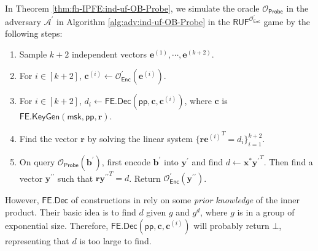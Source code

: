 In Theorem \ref{thm:fh-IPFE:ind-uf-OB-Probe}, we simulate the oracle $\mathcal{O}_{\textsf{Probe}}$ in the adversary $\mathcal{A}^\prime$ in Algorithm \ref{alg:adv:ind-uf-OB-Probe} in the $\textsf{RUF}^{ \mathcal{O}^\prime_{\textsf{Enc}} }$ game by the following steps:

\begin{enumerate}

\item Sample $k+2$ independent vectors $\mathbf{e}^{(1)}, \cdots, \mathbf{e}^{(k+2)}$.

\item For $i \in [k+2]$, $\mathbf{c}^{(i)} \gets \mathcal{O}^\prime_{\textsf{Enc}}(\mathbf{e}^{(i)})$.

\item For $i \in [k+2]$,  $d_i \gets \textsf{FE.Dec}(\textsf{pp}, \mathbf{c}, \mathbf{c}^{(i)})$, where $\mathbf{c}$ is $\textsf{FE.KeyGen}(\textsf{msk}, \textsf{pp}, \mathbf{r})$.

\item Find the vector $\mathbf{r}$ by solving the linear system $\{ \mathbf{r} {\mathbf{e}^{(i)}}^T = d_i \}_{i=1}^{k+2}$.

\item On query $\mathcal{O}_{\textsf{Probe}}(\mathbf{b}^\prime)$, first encode $\mathbf{b}^\prime$ into $\mathbf{y}^\prime$ and find $d \gets \mathbf{x}^{*}{\mathbf{y}^\prime}^T$. Then find a vector $\mathbf{y}^{\prime\prime}$ such that $\mathbf{r} {\mathbf{y}^{\prime\prime}}^T = d$. Return $\mathcal{O}^\prime_{\textsf{Enc}}(\mathbf{y}^{\prime\prime})$.

\end{enumerate}

However, $\textsf{FE.Dec}$ of constructions in \cite{cryptoeprint:2015/1255, 10.1007/978-3-319-45871-7_24, cryptoeprint:2016/440} rely on some \emph{prior knowledge} of the inner product. Their basic idea is to find $d$ given $g$ and $g^d$, where $g$ is in a group of exponential size. Therefore, $\textsf{FE.Dec}(\textsf{pp}, \mathbf{c}, \mathbf{c}^{(i)})$ will probably return $\bot$, representing that $d$ is too large to find.


